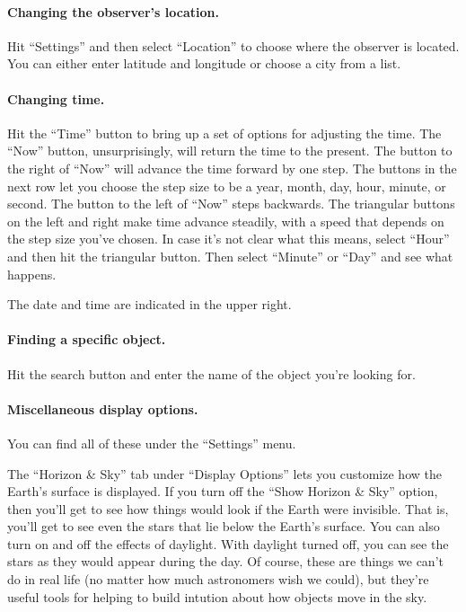 \paragraph{Changing the observer's location.} Hit
``Settings'' and then select ``Location'' to 
choose where the observer is located. You can either enter latitude
and longitude or choose a city from a list. 

\paragraph{Changing time.} Hit the ``Time''
button to bring up a set of options for adjusting the time.
The ``Now'' button, unsurprisingly, will return the time to the present.
The button to the right of ``Now'' will advance the time forward
by one step. The buttons in the next row let you choose the step size to be a year, month, day,
hour, minute, or second. The button to the left of ``Now'' steps
backwards.
The triangular buttons on the left and right make time advance 
steadily, with a speed that depends on the step size you've chosen.
In case it's not clear what this means, select ``Hour'' and then
hit the triangular button. Then select ``Minute'' or ``Day'' and
see what happens.

The date and time are indicated in the upper right.

\paragraph{Finding a specific object.} Hit the search button
and enter the name of the object you're looking for.

\paragraph{Miscellaneous display options.} 

You can find all of these under the ``Settings'' menu.

The ``Horizon \& Sky'' tab under ``Display Options'' lets you customize
how the Earth's surface is displayed. If you turn off the ``Show 
Horizon \& Sky'' option, then you'll get to see how things would
look if the Earth were invisible. That is, you'll get to see even
the stars that lie below the Earth's surface. 
You can also turn on and off the effects of daylight. With daylight turned
off, you can see the stars as they would appear during the day.
Of course, these are things we can't do in real life
(no matter how much astronomers wish we could), but they're
useful tools for helping to build intution about how
objects move in the sky.

